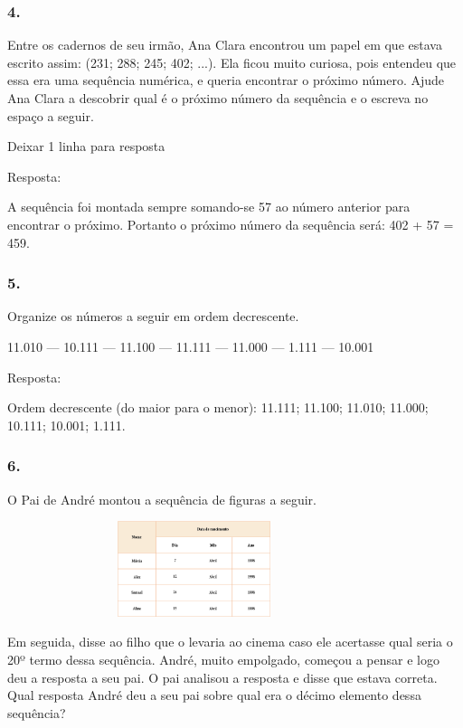 \begin{enumerate}
\begin{escolha}
\begin{enumerate}
\subsubsection{4.}\label{section-29}

Entre os cadernos de seu irmão, Ana Clara encontrou um papel em que estava escrito assim: (231; 288; 245; 402; ...). Ela ficou muito curiosa, pois entendeu que essa era uma sequência
numérica, e queria encontrar o próximo número. Ajude Ana Clara a descobrir qual é o próximo número da sequência e o
escreva no espaço a seguir.

Deixar 1 linha para resposta

Resposta:

A sequência foi montada sempre somando-se 57 ao número anterior para
encontrar o próximo. Portanto o próximo número da sequência será: 402 +
57 = 459.

\subsubsection{5.}\label{section-30}

Organize os números a seguir em ordem decrescente.

11.010 --- 10.111 --- 11.100 --- 11.111 --- 11.000 --- 1.111 --- 10.001

Resposta:

Ordem decrescente (do maior para o menor):
11.111; 11.100; 11.010; 11.000; 10.111; 10.001; 1.111.

\subsubsection{6.}\label{section-31}

O Pai de André montou a sequência de figuras a seguir.

\includegraphics[width=4.30871in,height=1.10010in]{media/image45.png}

Em seguida, disse ao filho que o levaria ao cinema caso ele acertasse
qual seria o 20º termo dessa sequência. André, muito empolgado, começou a
pensar e logo deu a resposta a seu pai. O pai analisou a resposta e
disse que estava correta. Qual resposta André deu a seu pai sobre qual era o décimo elemento
dessa sequência?


\end{enumerate}
\end{escolha}
\end{enumerate}
